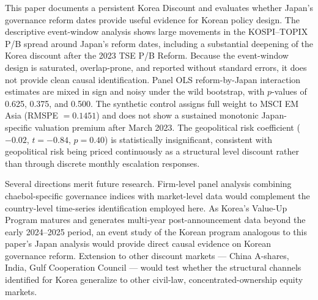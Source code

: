 \documentclass[12pt]{article}
\begin{document}
This paper documents a persistent Korea Discount and evaluates whether Japan's governance
reform dates provide useful evidence for Korean policy design. The descriptive event-window
analysis shows large movements in the KOSPI--TOPIX P/B spread around Japan's reform dates,
including a substantial deepening of the Korea discount after the 2023 TSE P/B Reform. Because
the event-window design is saturated, overlap-prone, and reported without standard errors, it
does not provide clean causal identification. Panel OLS reform-by-Japan interaction estimates
are mixed in sign and noisy under the wild bootstrap, with $p$-values of 0.625, 0.375, and
0.500. The synthetic control assigns full weight to MSCI EM Asia (RMSPE $=0.1451$) and does
not show a sustained monotonic Japan-specific valuation premium after March 2023. The
geopolitical risk coefficient ($-0.02$, $t=-0.84$, $p=0.40$) is statistically insignificant,
consistent with geopolitical risk being priced continuously as a structural level discount
rather than through discrete monthly escalation responses.

Several directions merit future research. Firm-level panel analysis combining chaebol-specific
governance indices with market-level data would complement the country-level time-series
identification employed here. As Korea's Value-Up Program matures and generates multi-year
post-announcement data beyond the early 2024--2025 period, an event study of the Korean
program analogous to this paper's Japan analysis would provide direct causal evidence on
Korean governance reform. Extension to other discount markets --- China A-shares, India,
Gulf Cooperation Council --- would test whether the structural channels identified for Korea
generalize to other civil-law, concentrated-ownership equity markets.



\end{document}
